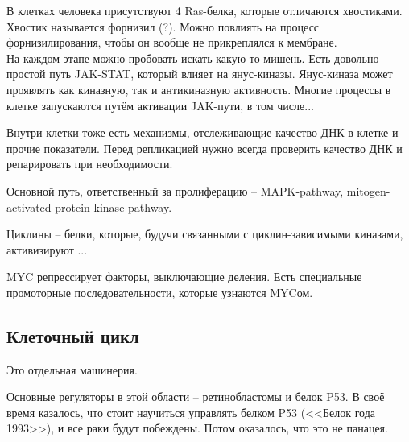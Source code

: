 \documentclass[main.tex]{subfiles}
\begin{document}
В клетках человека присутствуют 4 Ras-белка, которые отличаются хвостиками.
Хвостик называется форнизил (?).
Можно повлиять на процесс форнизилирования, чтобы он вообще не прикреплялся к мембране. \\

На каждом этапе можно пробовать искать какую-то мишень.
Есть довольно простой путь JAK-STAT, который влияет на янус-киназы.
Янус-киназа может проявлять как киназную, так и антикиназную активность.
Многие процессы в клетке запускаются путём активации JAK-пути, в том числе...

Внутри клетки тоже есть механизмы, отслеживающие качество ДНК в клетке и прочие показатели.
Перед репликацией нужно всегда проверить качество ДНК и репарировать при необходимости.

Основной путь, ответственный за пролиферацию -- MAPK-pathway, mitogen-activated protein kinase pathway.


Циклины -- белки, которые, будучи связанными с циклин-зависимыми киназами, активизируют  ...

MYC репрессирует факторы, выключающие деления.
Есть специальные промоторные последовательности, которые узнаются  MYCом.

\subsection{Клеточный цикл}

Это отдельная машинерия.

Основные регуляторы в этой области -- ретинобластомы и белок P53.
В своё время казалось, что стоит научиться управлять белком P53 (<<Белок года 1993>>), и все раки будут побеждены.
Потом оказалось, что это не панацея.
\end{document}
